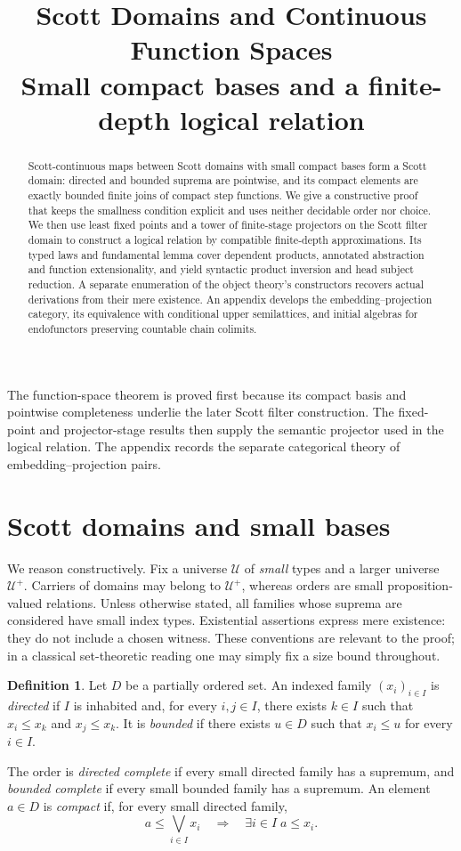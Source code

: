 \documentclass[11pt,a4paper]{article}
\title{Scott Domains and Continuous Function Spaces\\
  \large Small compact bases and a finite-depth logical relation}
\author{}
\date{}
\theoremstyle{definition}
\newtheorem{definition}[theorem]{Definition}
\theoremstyle{remark}
\newcommand{\UU}{\mathcal U}
\newcommand{\lub}{\bigvee}
\begin{document}
\maketitle

\begin{abstract}
Scott-continuous maps between Scott domains with small compact bases form
a Scott domain: directed and bounded suprema are pointwise, and its compact
elements are exactly bounded finite joins of compact step functions. We
give a constructive proof that keeps the smallness condition explicit and
uses neither decidable order nor choice. We then use least fixed points
and a tower of finite-stage projectors on the Scott filter domain to construct
a logical relation by compatible finite-depth approximations. Its typed
laws and fundamental lemma cover dependent products, annotated abstraction and function
extensionality, and yield syntactic product inversion and head subject reduction.
A separate enumeration of the object theory's constructors recovers actual
derivations from their mere existence. An appendix
develops the
embedding--projection category, its equivalence with conditional upper
semilattices, and initial algebras for endofunctors preserving countable
chain colimits.
\end{abstract}

The function-space theorem is proved first because its compact basis and
pointwise completeness underlie the later Scott filter construction.
The fixed-point and projector-stage results then supply the semantic
projector used in the logical relation. The appendix records the
separate categorical theory of embedding--projection pairs.

\section{Scott domains and small bases}\label{sec:bases}

We reason constructively. Fix a universe $\UU$ of \emph{small} types and a
larger universe $\UU^+$. Carriers of domains may belong to $\UU^+$, whereas
orders are small proposition-valued relations. Unless otherwise stated,
all families whose suprema are considered have small index types.
Existential assertions express mere existence: they do not include a
chosen witness. These conventions are relevant to the proof; in a
classical set-theoretic reading one may simply fix a size bound throughout.

\begin{definition}
Let $D$ be a partially ordered set. An indexed family $(x_i)_{i\in I}$ is
\emph{directed} if $I$ is inhabited and, for every $i,j\in I$, there exists
$k\in I$ such that $x_i\leq x_k$ and $x_j\leq x_k$. It is \emph{bounded}
if there exists $u\in D$ such that $x_i\leq u$ for every $i\in I$.

The order is \emph{directed complete} if every small directed family has a
supremum, and \emph{bounded complete} if every small bounded family has a
supremum. An element $a\in D$ is \emph{compact} if, for every small directed
family,
\[
 a\leq\lub_{i\in I}x_i
 \quad\Longrightarrow\quad
 \exists i\in I\; a\leq x_i.
\]
\end{definition}
\end{document}
